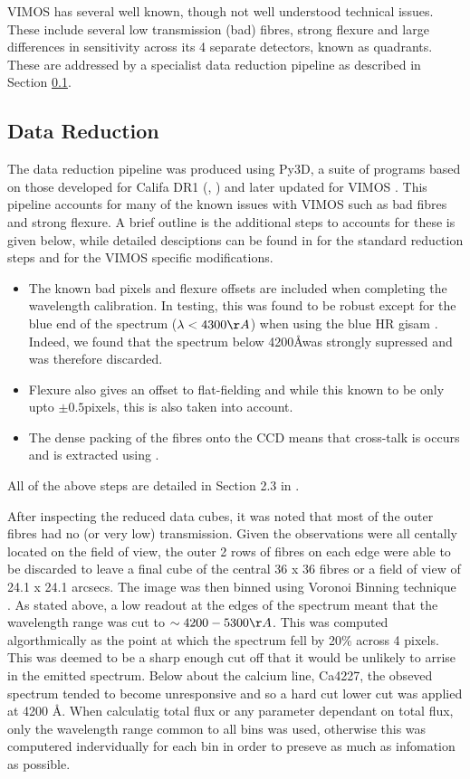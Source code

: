 \documentclass[a4paper,11pt]{article}
\begin{document}
		VIMOS has several well known, though not well understood technical issues. These include several low transmission (bad) fibres, strong flexure and large differences in sensitivity across its 4 separate detectors, known as quadrants. These are addressed by a specialist data reduction pipeline as described in Section \ref{subsec:reduct}. 

	\subsection{Data Reduction}
		\label{subsec:reduct}
		The data reduction pipeline was produced using Py3D, a suite of programs based on those developed for Califa DR1 (\cite{Sanchez2011}, \cite{Husemann2013}) and later updated for VIMOS \cite{Husemann2014}. This pipeline accounts for many of the known issues with VIMOS such as bad fibres and strong flexure. A brief outline is the additional steps to accounts for these is given below, while detailed desciptions can be found in \cite{Sanchez2011} for the standard reduction steps and \cite{Husemann2014} for the VIMOS specific modifications. 
		\begin{itemize}
		\item The known bad pixels and flexure offsets are included when completing the wavelength calibration. In testing, this was found to be robust except for the blue end of the spectrum ($\lambda < 4300 \AA$) when using the blue HR gisam \cite{Husemann2014}. Indeed, we found that the spectrum below 4200\AA was strongly supressed and was therefore discarded.
		\item Flexure also gives an offset to flat-fielding and while this known to be only upto $\pm0.5$pixels, this is also taken into account.
		\item The dense packing of the fibres onto the CCD means that cross-talk is occurs and is extracted using \cite{Horne1986}. 
		\end{itemize}
		All of the above steps are detailed in Section 2.3 in \cite{Husemann2014}.

		After inspecting the reduced data cubes, it was noted that most of the outer fibres had no (or very low) transmission. Given the observations were all centally located on the field of view, the outer 2 rows of fibres on each edge were able to be discarded to leave a final cube of the central 36 x 36 fibres or a field of view of 24.1 x 24.1 arcsecs. The image was then binned using Voronoi Binning technique \cite{Cappellari2003}. As stated above, a low readout at the edges of the spectrum meant that the wavelength range was cut to $\sim 4200 - 5300 \AA$. This was computed algorthmically as the point at which the spectrum fell by 20\% across 4 pixels. This was deemed to be a sharp enough cut off that it would be unlikely to arrise in the emitted spectrum. Below about the calcium line, Ca4227, the obseved spectrum tended to become unresponsive and so a hard cut lower cut was applied at 4200 \AA. When calculatig total flux or any parameter dependant on total flux, only the wavelength range common to all bins was used, otherwise this was computered indervidually for each bin in order to preseve as much as infomation as possible.
\end{document}
